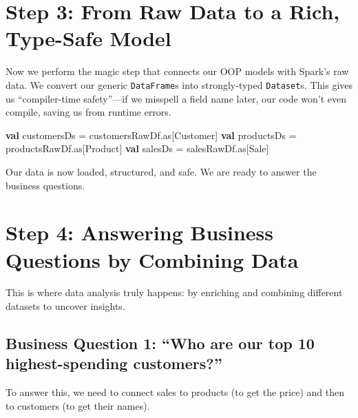 \documentclass[
  letterpaper,
  DIV=11,
  numbers=noendperiod]{scrreprt}
\newenvironment{Shaded}{\begin{snugshade}}{\end{snugshade}}
\newcommand{\KeywordTok}[1]{\textcolor[rgb]{0.00,0.23,0.31}{\textbf{#1}}}
\newcommand{\NormalTok}[1]{\textcolor[rgb]{0.00,0.23,0.31}{#1}}
\newcommand{\OperatorTok}[1]{\textcolor[rgb]{0.37,0.37,0.37}{#1}}
\begin{document}
\section{Step 3: From Raw Data to a Rich, Type-Safe
Model}\label{step-3-from-raw-data-to-a-rich-type-safe-model}

Now we perform the magic step that connects our OOP models with Spark's
raw data. We convert our generic \texttt{DataFrame}s into strongly-typed
\texttt{Dataset}s. This gives us ``compiler-time safety''---if we
misspell a field name later, our code won't even compile, saving us from
runtime errors.

\begin{Shaded}
\begin{Highlighting}[]
\KeywordTok{val}\NormalTok{ customersDs }\OperatorTok{=}\NormalTok{ customersRawDf}\OperatorTok{.}\NormalTok{as}\OperatorTok{[}\NormalTok{Customer}\OperatorTok{]}
\KeywordTok{val}\NormalTok{ productsDs }\OperatorTok{=}\NormalTok{ productsRawDf}\OperatorTok{.}\NormalTok{as}\OperatorTok{[}\NormalTok{Product}\OperatorTok{]}
\KeywordTok{val}\NormalTok{ salesDs }\OperatorTok{=}\NormalTok{ salesRawDf}\OperatorTok{.}\NormalTok{as}\OperatorTok{[}\NormalTok{Sale}\OperatorTok{]}
\end{Highlighting}
\end{Shaded}

Our data is now loaded, structured, and safe. We are ready to answer the
business questions.

\section{Step 4: Answering Business Questions by Combining
Data}\label{step-4-answering-business-questions-by-combining-data}

This is where data analysis truly happens: by enriching and combining
different datasets to uncover insights.

\subsection{\texorpdfstring{\textbf{Business Question 1: ``Who are our
top 10 highest-spending
customers?''}}{Business Question 1: ``Who are our top 10 highest-spending customers?''}}\label{business-question-1-who-are-our-top-10-highest-spending-customers}

To answer this, we need to connect sales to products (to get the price)
and then to customers (to get their names).
\end{document}
